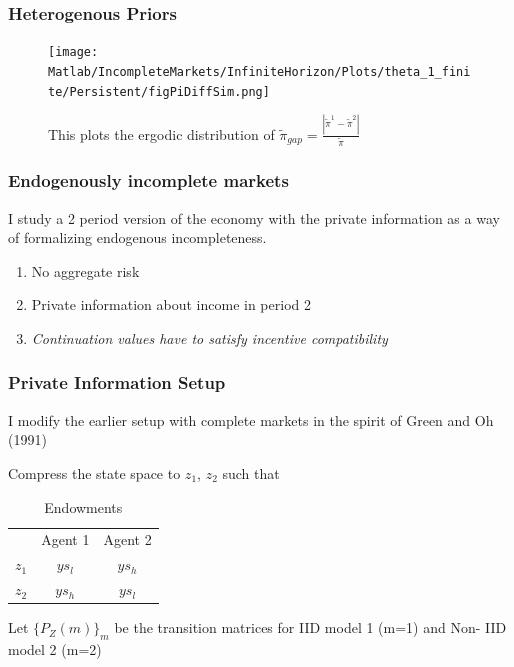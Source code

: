 \documentclass{beamer}
\theoremstyle{definition}
\begin{document}
\begin{frame}
\frametitle{Heterogenous Priors}
\begin{figure}[htbp]
\centering
	  \texttt{[image: Matlab/IncompleteMarkets/InfiniteHorizon/Plots/theta\_1\_finite/Persistent/figPiDiffSim.png]}

	\caption{\small{This plots the ergodic distribution of $\tilde{\pi}_{gap}=\frac{|\tilde{\pi}^1-\tilde{\pi}^2|}{\tilde{\pi}}$ }}
 
	\label{fig:figPiDiff}
\end{figure} 
\end{frame}

\begin{frame}
\frametitle{Endogenously incomplete markets}
I study a 2 period version of the  economy with the private
information as a way of formalizing endogenous incompleteness.
\begin{enumerate}
\item No aggregate risk
\item Private information about income in period 2
\item \emph{Continuation values have to satisfy incentive compatibility}

\end{enumerate}
\end{frame}


\begin{frame}
\frametitle{Private Information Setup }
I modify the earlier setup with complete markets in the spirit of  Green and Oh (1991)

Compress the state space to $z_1$, $z_2$ such that

\begin{table}[h]
  \centering
  \begin{tabular}[h]{l c c}
    
& Agent 1 & Agent 2 \\
$z_1$ & $ys_l$ & $y s_h$  \\
$z_2$ & $ys_h$ & $ys_l$ \\
 
  \end{tabular}
  \caption{Endowments}
  
\end{table}

Let $\{P_Z(m)\}_m  $ be the transition matrices for IID model 1 (m=1) and
Non- IID model 2 (m=2)


\end{frame}
\end{document}
